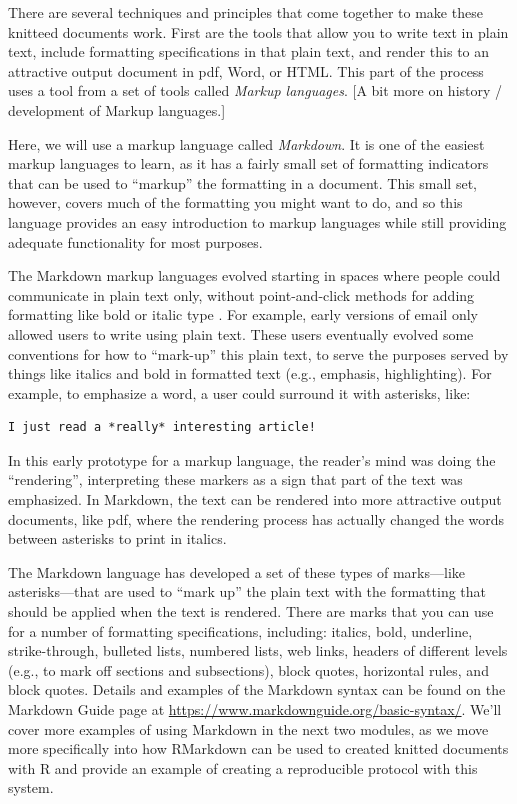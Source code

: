 \documentclass[]{tufte-book}
\begin{document}
There are several techniques and principles that come together to make these
knitteed documents work. First are the tools that allow you to write text
in plain text, include formatting specifications in that plain text, and
render this to an attractive output document in pdf, Word, or HTML. This
part of the process uses a tool from a set of tools called \emph{Markup languages}.
{[}A bit more on history / development of Markup languages.{]}

Here, we will use a markup language called \emph{Markdown}. It is one of the easiest
markup languages to learn, as it has a fairly small set of formatting indicators
that can be used to ``markup'' the formatting in a document. This small set,
however, covers much of the formatting you might want to do, and so this
language provides an easy introduction to markup languages while still providing
adequate functionality for most purposes.

The Markdown markup languages evolved starting in spaces where people could
communicate in plain text only, without point-and-click methods for adding
formatting like bold or italic type \citep{buffalo2015bioinformatics}. For example,
early versions of email only allowed users to write using plain text. These
users eventually evolved some conventions for how to ``mark-up'' this plain text,
to serve the purposes served by things like italics and bold in formatted text
(e.g., emphasis, highlighting). For example, to emphasize a word, a user could
surround it with asterisks, like:

\begin{verbatim}
I just read a *really* interesting article!
\end{verbatim}

In this early prototype for a markup language, the reader's mind was doing
the ``rendering'', interpreting these markers as a sign that part of the text
was emphasized. In Markdown, the text can be rendered into more attractive
output documents, like pdf, where the rendering process has actually
changed the words between asterisks to print in italics.

The Markdown language has developed a set of these types of marks---like
asterisks---that are used to ``mark up'' the plain text with the formatting
that should be applied when the text is rendered. There are marks that you
can use for a number of formatting specifications, including: italics,
bold, underline, strike-through, bulleted lists, numbered lists, web links,
headers of different levels (e.g., to mark off sections and subsections),
block quotes, horizontal rules, and block quotes. Details and examples of
the Markdown syntax can be found on the Markdown Guide page at
\url{https://www.markdownguide.org/basic-syntax/}. We'll cover more examples of
using Markdown in the next two modules, as we move more specifically into
how RMarkdown can be used to created knitted documents with R and provide
an example of creating a reproducible protocol with this system.
\end{document}
